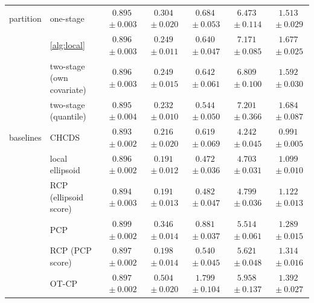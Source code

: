 \begin{table}[!t]
{\begin{tabular}{llccccc}
\addlinespace[2pt]
partition & one-stage & $0.895${\scriptsize${}\pm0.003$} & $0.304${\scriptsize${}\pm0.020$} & $0.684${\scriptsize${}\pm0.053$} & $6.473${\scriptsize${}\pm0.114$} & $1.513${\scriptsize${}\pm0.029$}\\
 & \cref{alg:local} & $0.896${\scriptsize${}\pm0.003$} & $0.249${\scriptsize${}\pm0.011$} & $0.640${\scriptsize${}\pm0.047$} & $7.171${\scriptsize${}\pm0.085$} & $1.677${\scriptsize${}\pm0.025$}\\
 & two-stage (own covariate) & $0.896${\scriptsize${}\pm0.003$} & $0.249${\scriptsize${}\pm0.015$} & $0.642${\scriptsize${}\pm0.061$} & $6.809${\scriptsize${}\pm0.100$} & $1.592${\scriptsize${}\pm0.030$}\\
 & two-stage (quantile) & $0.895${\scriptsize${}\pm0.004$} & $0.232${\scriptsize${}\pm0.010$} & $0.544${\scriptsize${}\pm0.050$} & $7.201${\scriptsize${}\pm0.366$} & $1.684${\scriptsize${}\pm0.087$}\\
\addlinespace[2pt]
baselines & CHCDS & $0.893${\scriptsize${}\pm0.002$} & $0.216${\scriptsize${}\pm0.020$} & $0.619${\scriptsize${}\pm0.069$} & $4.242${\scriptsize${}\pm0.045$} & $0.991${\scriptsize${}\pm0.005$}\\
 & local ellipsoid & $0.896${\scriptsize${}\pm0.002$} & $0.191${\scriptsize${}\pm0.012$} & $0.472${\scriptsize${}\pm0.036$} & $4.703${\scriptsize${}\pm0.031$} & $1.099${\scriptsize${}\pm0.010$}\\
 & RCP (ellipsoid score) & $0.894${\scriptsize${}\pm0.003$} & $0.191${\scriptsize${}\pm0.013$} & $0.482${\scriptsize${}\pm0.047$} & $4.799${\scriptsize${}\pm0.036$} & $1.122${\scriptsize${}\pm0.013$}\\
 & PCP & $0.899${\scriptsize${}\pm0.002$} & $0.346${\scriptsize${}\pm0.014$} & $0.881${\scriptsize${}\pm0.037$} & $5.514${\scriptsize${}\pm0.061$} & $1.289${\scriptsize${}\pm0.015$}\\
 & RCP (PCP score) & $0.897${\scriptsize${}\pm0.002$} & $0.198${\scriptsize${}\pm0.014$} & $0.540${\scriptsize${}\pm0.045$} & $5.621${\scriptsize${}\pm0.048$} & $1.314${\scriptsize${}\pm0.016$}\\
 & OT-CP & $0.897${\scriptsize${}\pm0.002$} & $0.504${\scriptsize${}\pm0.020$} & $1.799${\scriptsize${}\pm0.104$} & $5.958${\scriptsize${}\pm0.137$} & $1.392${\scriptsize${}\pm0.027$}\\
\bottomrule
\end{tabular}}
\end{table}
